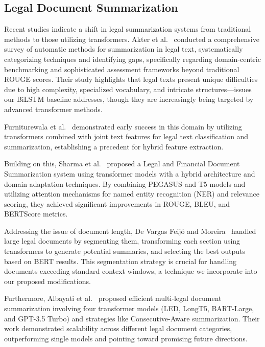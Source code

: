 \documentclass{llncs}
\begin{document}
\subsection{Legal Document Summarization}

Recent studies indicate a shift in legal summarization systems from traditional methods to those utilizing transformers. Akter et al.~\cite{akter2025legal} conducted a comprehensive survey of automatic methods for summarization in legal text, systematically categorizing techniques and identifying gaps, specifically regarding domain-centric benchmarking and sophisticated assessment frameworks beyond traditional ROUGE scores. Their study highlights that legal texts present unique difficulties due to high complexity, specialized vocabulary, and intricate structures—issues our BiLSTM baseline addresses, though they are increasingly being targeted by advanced transformer methods.

Furniturewala et al.~\cite{furniturewala2021legal} demonstrated early success in this domain by utilizing transformers combined with joint text features for legal text classification and summarization, establishing a precedent for hybrid feature extraction.

Building on this, Sharma et al.~\cite{sharma2024legal} proposed a Legal and Financial Document Summarization system using transformer models with a hybrid architecture and domain adaptation techniques. By combining PEGASUS and T5 models and utilizing attention mechanisms for named entity recognition (NER) and relevance scoring, they achieved significant improvements in ROUGE, BLEU, and BERTScore metrics.

Addressing the issue of document length, De Vargas Feijó and Moreira~\cite{vargas2023legal} handled large legal documents by segmenting them, transforming each section using transformers to generate potential summaries, and selecting the best outputs based on BERT results. This segmentation strategy is crucial for handling documents exceeding standard context windows, a technique we incorporate into our proposed modifications.

Furthermore, Albayati et al.~\cite{albayati2025multi} proposed efficient multi-legal document summarization involving four transformer models (LED, LongT5, BART-Large, and GPT-3.5 Turbo) and strategies like Consecutive-Aware summarization. Their work demonstrated scalability across different legal document categories, outperforming single models and pointing toward promising future directions.
\end{document}
